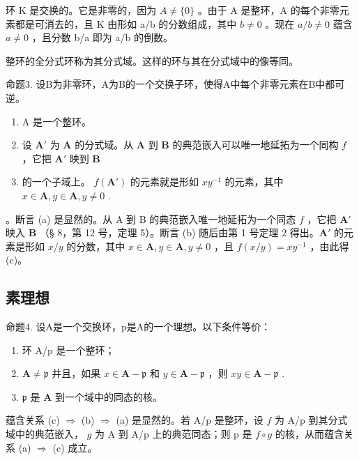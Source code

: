 环 K 是交换的。它是非零的，因为 \(A \neq \{0\}\) 。由于 A 是整环，A 的每个非零元素都是可消去的，且 K 由形如 a/b 的分数组成，其中 \(b \neq 0\) 。现在 \(a/b \neq 0\) 蕴含 \(a \neq 0\) ，且分数 b/a 即为 a/b 的倒数。

整环的全分式环称为其分式域。这样的环与其在分式域中的像等同。

命题3. 设B为非零环，A为B的一个交换子环，使得A中每个非零元素在B中都可逆。

\begin{enumerate}
\def\labelenumi{(\alph{enumi})}
\item
  A 是一个整环。
\item
  设 \(\mathbf{A}'\) 为 \(\mathbf{A}\) 的分式域。从 \(\mathbf{A}\) 到 \(\mathbf{B}\) 的典范嵌入可以唯一地延拓为一个同构 \(f\) ，它把 \(\mathbf{A}'\) 映到 \(\mathbf{B}\)
\item
  的一个子域上。 \(f(\mathbf{A}')\) 的元素就是形如 \(xy^{-1}\) 的元素，其中 \(x \in \mathbf{A}, y \in \mathbf{A}, y \neq 0\) .
\end{enumerate}

。断言 (a) 是显然的。从 A 到 B 的典范嵌入唯一地延拓为一个同态 \(f\) ，它把 \(\mathbf{A}'\) 映入 \(\mathbf{B}\) （§ 8，第 12 号，定理 5）。断言 (b) 随后由第 1 号定理 2 得出。\(\mathbf{A}'\) 的元素是形如 \(x / y\) 的分数，其中 \(x \in \mathbf{A}, y \in \mathbf{A}, y \neq 0\) ，且 \(f(x / y) = xy^{-1}\) ，由此得 (c)。

\subsection{素理想}

命题4. 设A是一个交换环，p是A的一个理想。以下条件等价：

\begin{enumerate}
\def\labelenumi{(\alph{enumi})}
\item
  环 A/p 是一个整环；
\item
  \(\mathbf{A} \neq \mathfrak{p}\) 并且，如果 \(x \in \mathbf{A} - \mathfrak{p}\) 和 \(y \in \mathbf{A} - \mathfrak{p}\) ，则 \(xy \in \mathbf{A} - \mathfrak{p}\) .
\item
  \(\mathfrak{p}\) 是 \(\mathbf{A}\) 到一个域中的同态的核。
\end{enumerate}

蕴含关系 (c) \(\Rightarrow\) (b) \(\Rightarrow\) (a) 是显然的。若 A/p 是整环，设 \(f\) 为 A/p 到其分式域中的典范嵌入， \(g\) 为 A 到 A/p 上的典范同态；则 p 是 \(f \circ g\) 的核，从而蕴含关系 (a) \(\Rightarrow\) (c) 成立。

